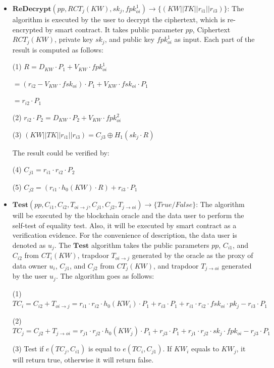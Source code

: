 \documentclass[journal,10pt]{IEEEtran}
\begin{document}
\begin{itemize}
    \item $ \boldsymbol{ReDecrypt}(pp, RCT_j(KW), sk_{j}, fpk_{oi}^1) \to \{(KW||TK||r_{i1}||r_{i3})\} $: The algorithm is executed by the user to decrypt the ciphertext, which is re-encrypted by smart contract.
    It takes public parameter $pp$, Ciphertext $RCT_j(KW)$, private key $sk_{j}$, and public key $fpk_{oi}^1$ as input. Each part of the result is computed as follows: 
    
    (1) $R = D_{KW} \cdot P_1 + V_{KW} \cdot fpk_{oi}^1$
    
    $= (r_{i2} - V_{KW} \cdot fsk_{oi}) \cdot P_1 + V_{KW} \cdot fsk_{oi} \cdot P_1$
    
    $= r_{i2} \cdot P_1$
    
    (2) $r_{i2} \cdot P_2  = D_{KW} \cdot P_2 + V_{KW} \cdot fpk_{oi}^2$
    
    (3) $(KW||TK||r_{i1}||r_{i3}) = C_{j3} \oplus H_1(sk_j \cdot R)$
    
    The result could be verified by: 
    
    (4) $C_{j1} = r_{i1} \cdot r_{i2} \cdot P_2$
    
    (5) $C_{j2} = (r_{i1} \cdot h_0(KW) \cdot R) + r_{i3} \cdot P_1$
\end{itemize}
\begin{itemize}
    \item $ \boldsymbol{Test}(pp, C_{i1}, C_{i2}, T_{oi \to j}, C_{j1}, C_{j2}, T_{j \to oi}) \to \{True/False\} $: The algorithm will be executed by the blockchain oracle and the data user to perform the self-test of equality test. Also, it will be executed by smart contract as a verification evidence.
    For the convenience of description, the data user is denoted as $u_j$. The $\boldsymbol{Test}$ algorithm takes the public parameters $pp$, $C_{i1}$, and $C_{i2}$ from $CT_i(KW)$, trapdoor $T_{oi \to j}$ generated by the oracle as the proxy of data owner $u_i$, $C_{j1}$, and $C_{j2}$ from $CT_j(KW)$, and trapdoor $T_{j \to oi}$ generated by the user $u_j$.
    The algorithm goes as follows:
    
    (1) $TC_i = C_{i2} + T_{oi \to j} = r_{i1} \cdot r_{i2} \cdot h_0(KW_i) \cdot P_1 + r_{i3} \cdot P_1 + r_{i1} \cdot r_{i2} \cdot fsk_{oi} \cdot pk_j - r_{i3} \cdot P_1$
    
    (2) $TC_j = C_{j2} + T_{j \to oi} = r_{j1} \cdot r_{j2} \cdot h_0(KW_j) \cdot P_1 + r_{j3} \cdot P_1 + r_{j1} \cdot r_{j2} \cdot sk_{j} \cdot fpk_{oi} - r_{j3} \cdot P_1$
    
    (3) Test if $e(TC_j, C_{i1})$ is equal to $e(TC_i, C_{j1})$. If $KW_i$ equals to $KW_j$, it will return true, otherwise it will return false.
    
\end{itemize}
\end{document}
